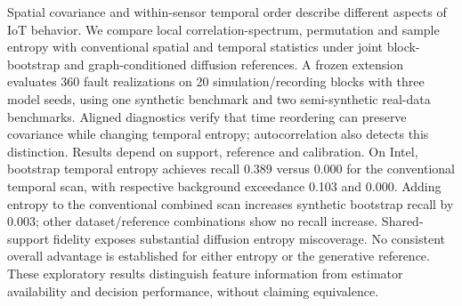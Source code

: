 Spatial covariance and within-sensor temporal order describe different aspects
of IoT behavior. We compare local correlation-spectrum, permutation and sample
entropy with conventional spatial and temporal statistics under joint block-bootstrap
and graph-conditioned diffusion references. A frozen extension evaluates
360 fault realizations on 20 simulation/recording blocks with three model seeds,
using one synthetic benchmark and two semi-synthetic real-data benchmarks.
Aligned diagnostics verify that time reordering can preserve covariance while
changing temporal entropy; autocorrelation also detects this distinction.
Results depend on support, reference and calibration. On Intel, bootstrap temporal
entropy achieves recall 0.389 versus 0.000 for the conventional temporal
scan, with respective background exceedance 0.103 and 0.000.
Adding entropy to the conventional combined scan increases synthetic bootstrap
recall by 0.003; other dataset/reference combinations show no recall increase.
Shared-support fidelity exposes substantial diffusion entropy miscoverage.
No consistent overall advantage is established for either entropy or the
generative reference. These exploratory results distinguish feature information
from estimator availability and decision performance, without claiming equivalence.
